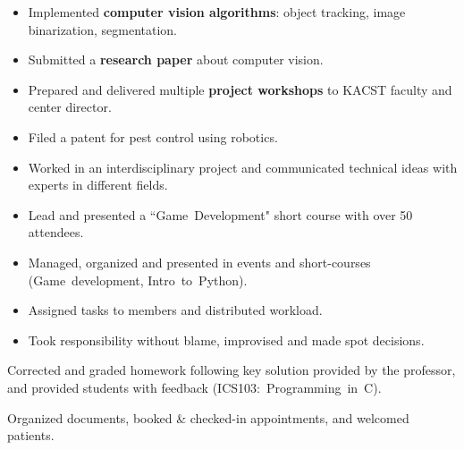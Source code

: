 
\begin{itemize}
    \item Implemented \textbf{computer vision algorithms}: object tracking, image binarization, segmentation.
    \item Submitted a \textbf{research paper} about computer vision.
    \item Prepared and delivered multiple \textbf{project workshops} to KACST faculty and center director.
    \item Filed a patent for pest control using robotics.
    \item Worked in an interdisciplinary project and communicated technical ideas with experts in different fields.
\end{itemize}

\divider

\begin{itemize}
    \item Lead and presented a ``Game~Development" short course with over 50 attendees.
    \item Managed, organized and presented in events and short-courses (Game~development, Intro~to~Python).
    \item Assigned tasks to members and distributed workload.
    \item Took responsibility without blame, improvised and made spot decisions.
\end{itemize}

\divider


Corrected and graded homework following key solution provided by the professor, and provided students with feedback (ICS103:~Programming~in~C).

\divider


Organized documents, booked \& checked-in appointments, and welcomed patients.

